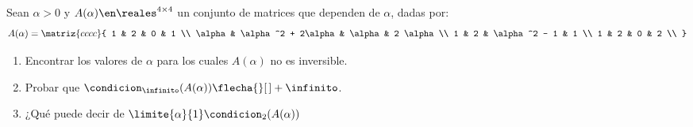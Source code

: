 \begin{enunciado}{\ejExtra}
  Sean $\alpha > 0$ y $A(\alpha) \en \reales^{4 \times 4}$ un conjunto de matrices que dependen de $\alpha$, dadas por:
  $$
    A(\alpha) =
    \matriz{cccc}{
      1 & 2 & 0 & 1 \\
      \alpha & \alpha^2 + 2\alpha & \alpha & 2 \alpha \\
      1 & 2 & \alpha^2 - 1 & 1 \\
      1 & 2 & 0 & 2 \\
    }
  $$

  \begin{enumerate}[label=\alph*)]
    \item Encontrar los valores de $\alpha$ para los cuales $A(\alpha)$ no es inversible.
    \item Probar que $\condicion_\infinito(A(\alpha)) \flecha{}[$\alpha {}$] +\infinito$.
    \item ¿Qué puede decir de $\limite{\alpha}{1} \condicion_2(A(\alpha))$
  \end{enumerate}
\end{enunciado}

